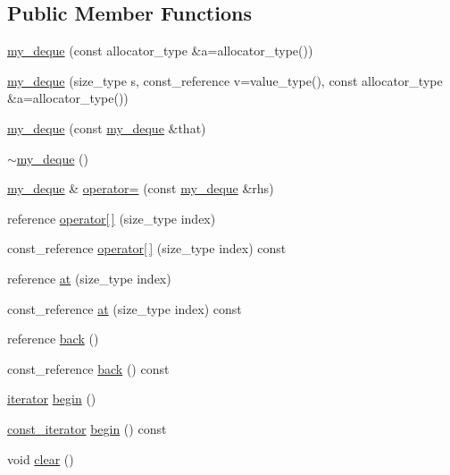 \subsection*{Public Member Functions}
\begin{DoxyCompactItemize}
\item 
\hyperlink{classmy__deque_ad2ac9d80048c55fcc045d2861c73aa1a}{my\-\_\-deque} (const allocator\-\_\-type \&a=allocator\-\_\-type())
\item 
\hyperlink{classmy__deque_aeaf4c625438497a7cd6a670da6c2c08b}{my\-\_\-deque} (size\-\_\-type s, const\-\_\-reference v=value\-\_\-type(), const allocator\-\_\-type \&a=allocator\-\_\-type())
\item 
\hyperlink{classmy__deque_a59015bc46e6096555d631d69dc8fd7e7}{my\-\_\-deque} (const \hyperlink{classmy__deque}{my\-\_\-deque} \&that)
\item 
\hyperlink{classmy__deque_ae22194ee436865a59a7475c339a9c1ca}{$\sim$my\-\_\-deque} ()
\item 
\hyperlink{classmy__deque}{my\-\_\-deque} \& \hyperlink{classmy__deque_aaa103f2058854bb98e500de6305b1564}{operator=} (const \hyperlink{classmy__deque}{my\-\_\-deque} \&rhs)
\item 
reference \hyperlink{classmy__deque_a489b77decf4d424f43092e194d69444f}{operator\mbox{[}$\,$\mbox{]}} (size\-\_\-type index)
\item 
const\-\_\-reference \hyperlink{classmy__deque_ad79fcd9e94dfc5566e1cd0ce606cf208}{operator\mbox{[}$\,$\mbox{]}} (size\-\_\-type index) const 
\item 
reference \hyperlink{classmy__deque_a75106748e6ff8735e40560e7335bd500}{at} (size\-\_\-type index)
\item 
const\-\_\-reference \hyperlink{classmy__deque_a9642816a10e6a6ee1f8a5367987b8ee8}{at} (size\-\_\-type index) const 
\item 
reference \hyperlink{classmy__deque_a1d9aadb5bedc29da86d4323587cd5e4d}{back} ()
\item 
const\-\_\-reference \hyperlink{classmy__deque_ac273f9574a95af619b9f0dcc0d2e89d0}{back} () const 
\item 
\hyperlink{classmy__deque_1_1iterator}{iterator} \hyperlink{classmy__deque_aef8cac69d47cb1c274896b82ba8f453a}{begin} ()
\item 
\hyperlink{classmy__deque_1_1const__iterator}{const\-\_\-iterator} \hyperlink{classmy__deque_a8612539eff4ee446f85ffb30abf91a69}{begin} () const 
\item 
void \hyperlink{classmy__deque_aa29f90c63cde532f5fc169e8e66b514c}{clear} ()

\end{DoxyCompactItemize}
